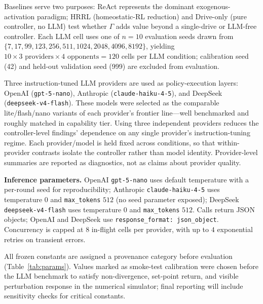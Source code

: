 \documentclass{article}
\begin{document}
Baselines serve two purposes: ReAct represents the dominant exogenous-activation paradigm; HRRL (homeostatic-RL reduction) and Drive-only (pure controller, no LLM) test whether $\Gamma$ adds value beyond a single-drive or LLM-free controller. Each LLM cell uses one of $n=10$ evaluation seeds drawn from $\{7, 17, 99, 123, 256, 511, 1024, 2048, 4096, 8192\}$, yielding $10 \times 3 \text{ providers} \times 4 \text{ opponents} = 120$ cells per LLM condition; calibration seed (42) and held-out validation seed (999) are excluded from evaluation.

Three instruction-tuned LLM providers are used as policy-execution layers: OpenAI (\texttt{gpt-5-nano}), Anthropic (\texttt{claude-haiku-4-5}), and DeepSeek (\texttt{deepseek-v4-flash}). These models were selected as the comparable lite/flash/nano variants of each provider's frontier line—well benchmarked and roughly matched in capability tier. Using three independent providers reduces the controller-level findings' dependence on any single provider's instruction-tuning regime. Each provider/model is held fixed across conditions, so that within-provider contrasts isolate the controller rather than model identity. Provider-level summaries are reported as diagnostics, not as claims about provider quality.

\textbf{Inference parameters.} OpenAI \texttt{gpt-5-nano} uses default temperature with a per-round seed for reproducibility; Anthropic \texttt{claude-haiku-4-5} uses temperature $0$ and \texttt{max\_tokens} $512$ (no seed parameter exposed); DeepSeek \texttt{deepseek-v4-flash} uses temperature $0$ and \texttt{max\_tokens} $512$. Calls return JSON objects; OpenAI and DeepSeek use \texttt{response\_format: json\_object}. Concurrency is capped at $8$ in-flight cells per provider, with up to $4$ exponential retries on transient errors.

All frozen constants are assigned a provenance category before evaluation (Table~\ref{tab:params}). Values marked as smoke-test calibration were chosen before the LLM benchmark to satisfy non-divergence, set-point return, and visible perturbation response in the numerical simulator; final reporting will include sensitivity checks for critical constants.
\end{document}
